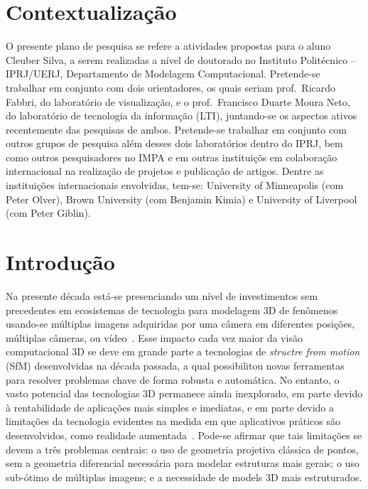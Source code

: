 \documentclass[a4paper,titlepage]{article}
\begin{document}


%


\section{Contextualização}

O presente plano de pesquisa se refere a atividades propostas para o aluno
Cleuber Silva, a serem realizadas a nível de doutorado no Instituto
Politécnico -- IPRJ/UERJ, Departamento de Modelagem Computacional.
Pretende-se trabalhar em conjunto com dois orientadores, os quais seriam prof.\
Ricardo Fabbri, do laboratório de visualização, e o prof.\ Francisco Duarte
Moura Neto, do laboratório de tecnologia da informação (LTI), juntando-se os
aspectos ativos recentemente das pesquisas de ambos. Pretende-se trabalhar em
conjunto com outros grupos de pesquisa além desses dois laboratórios dentro do
IPRJ, bem como outros pesquisadores no IMPA e em outras instituiçõs em
colaboração internacional na realização de projetos e publicação de artigos.
Dentre as instituições internacionais envolvidas, tem-se: University of
Minneapolis (com Peter Olver), Brown University (com Benjamin Kimia) e
University of Liverpool (com Peter Giblin).

\section{Introdução}


Na presente década está-se presenciando um nível de investimentos sem
precedentes em ecosistemas de tecnologia para modelagem 3D de fenômenos
usando-se múltiplas imagens adquiridas por uma câmera em diferentes posições,
múltiplas câmeras, ou vídeo~\cite{AppleKeynote:2018}. %
Esse impacto cada vez maior da visão computacional 3D se deve em grande parte a
tecnologias de \emph{structre from motion} (SfM) desenvolvidas na década
passada, a qual possibilitou novas ferramentas para resolver problemas chave de
forma robusta e automática. No entanto, o vasto potencial das tecnologias 3D
permanece ainda inexplorado, em parte devido à rentabilidade de aplicações mais
simples e imediatas, e em parte devido a limitações da tecnologia evidentes
na medida em que aplicativos práticos são desenvolvidos, como realidade
aumentada~\cite{AppleKeynote:2018}. Pode-se afirmar que tais limitações se devem
a três problemas centrais: o uso de geometria projetiva clássica de pontos, sem 
a geometria diferencial necessária para modelar estruturas mais gerais; o uso
sub-ótimo de múltiplas imagens; e a necessidade de models 3D mais
estruturados.
\end{document}
